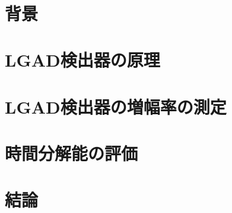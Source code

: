 \documentclass[uplatex]{jsbook}
\begin{document}
\frontmatter


\newpage
\thispagestyle{empty}
~
\newpage

\thispagestyle{empty}
  

\pagestyle{headings}
\setcounter{tocdepth}{2}
\tableofcontents
\listoffigures
\listoftables

\mainmatter

  \chapter{背景}
  
  
  
 
  \chapter{LGAD検出器の原理}
  
  
  
  
  
  
  

  \chapter{LGAD検出器の増幅率の測定}
  
  
  
  
  

 \chapter{時間分解能の評価}
 
 
 
 

 \chapter{結論}
 

 

 
 
\end{document}
